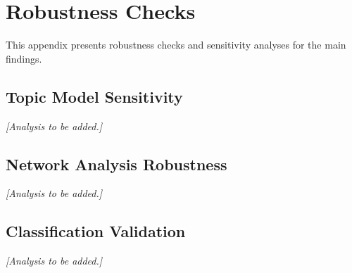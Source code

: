 \documentclass[../main.tex]{subfiles}
\begin{document}
\chapter{Robustness Checks}

This appendix presents robustness checks and sensitivity analyses for the main findings.

\section{Topic Model Sensitivity}

\textit{[Analysis to be added.]}

\section{Network Analysis Robustness}

\textit{[Analysis to be added.]}

\section{Classification Validation}

\textit{[Analysis to be added.]}
\end{document}
